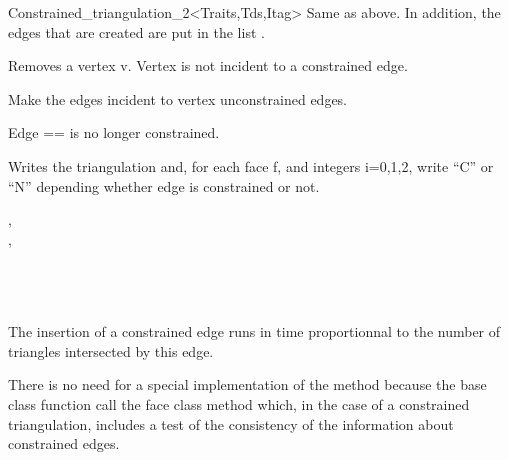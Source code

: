 \begin{ccRefClass}{Constrained_triangulation_2<Traits,Tds,Itag>}
{Same as above. In addition,  the edges that are created are put in
the list .} 

{ Removes a vertex v. 
\ccPrecond Vertex   is not incident to a constrained edge.}

{Make the edges incident to vertex  unconstrained edges.}

{ Edge == is no longer constrained.}


{Writes the triangulation and, for each face f, and integers i=0,1,2,
write ``C'' or ``N'' depending whether edge 
 is constrained or not.}

\ccSeeAlso
{}, \\
, \\
 \\
 \\
 \\





 The insertion of a constrained edge runs in time
proportionnal to the number of triangles intersected by this edge.

There is no need for a special implementation
of the method \ccVar{}
because the base class function
call the face class method
which, in the case of a constrained triangulation,
includes a test of the consistency of the
information about constrained edges.

\end{ccRefClass}


